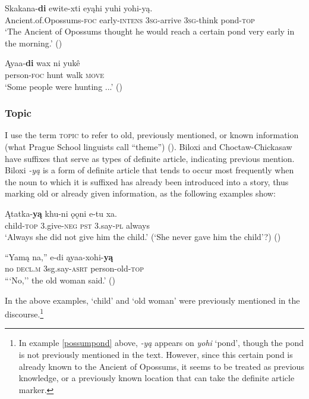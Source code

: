 \documentclass[output=paper]{LSP/langsci}
\begin{document}
\ea\label{possumpond}
\gll 	Skakana-\textbf{di} ewite-xti eyąhi yuhi yohi-y\k{a}. \\
	Ancient.of.Opossums-\textsc{foc} early-\textsc{intens} \textsc{3sg}-arrive \textsc{3sg}-think pond-\textsc{top}\\
\glt `The Ancient of Opossums thought he would reach a certain pond very early in the morning.' (\citealt[26]{DorseySwanton1912})
\z

\ea
\gll	Ąyaa-\textbf{di} wax ni yukê \\
	person-\textsc{foc} hunt walk \textsc{move}\\
\glt `Some people were hunting ...' (\citealt[65]{DorseySwanton1912})
\z

\subsubsection{Topic}

I use the term \textsc{topic} to refer to old, previously mentioned, or known information (what Prague School linguists call “theme”) (\citealt[271]{Payne1997}). Biloxi and Choctaw-Chickasaw have suffixes that serve as types of definite article, indicating previous mention. Biloxi \emph{-yą} is a form of definite article that tends to occur most frequently when the noun to which it is suffixed has already been introduced into a story, thus marking old or already given information, as the following examples show: 

\ea
\gll	Ątatka-\textbf{yą } khu-ni 	 ǫǫni e-tu 	 xa.\\ 
child-\textsc{top} 3.give-\textsc{neg} \textsc{pst} 	 3.say-\textsc{pl} always \\
\glt `Always she did not give him the child.' (`She never gave him the child'?) (\citealt[43]{DorseySwanton1912})
\z

\ea
\gll	“Yamą na,” 	 e-di 	 ąyaa-xohi-\textbf{yą}\\
	\hspace{.6em}no 	\textsc{decl.m} 3sg.say-\textsc{asrt} person-old-\textsc{top} \\
\glt ```No,'' the old woman said.' (\citealt[67]{DorseySwanton1912})
\z

In the above examples, `child' and `old woman' were previously mentioned in the discourse.\footnote{In example \ref{possumpond} above, \emph{-yą} appears on \emph{yohi} `pond', though the pond is not previously mentioned in the text. However, since this certain pond is already known to the Ancient of Opossums, it seems to be treated as previous knowledge, or a previously known location that can take the definite article marker.}
\end{document}
